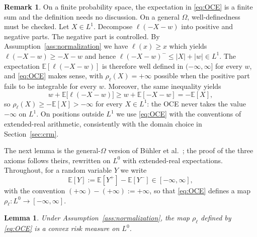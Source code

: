 \documentclass[11pt,a4paper]{report}
\numberwithin{equation}{chapter}
\theoremstyle{plain}
\newtheorem{lemma}[proposition]{Lemma}
\theoremstyle{definition}
\newtheorem{remark}[proposition]{Remark}
\newcommand{\E}{\mathbb{E}}
\begin{document}
\begin{remark}\label{rem:oce-welldef}
    On a finite probability space, the expectation in \eqref{eq:OCE} is a finite sum and the definition needs no discussion. On a general $\Omega$, well-definedness must be checked. Let $X\in L^1$. Decompose $\ell(-X-w)$ into positive and negative parts. The negative part is controlled. By Assumption~\ref{ass:normalization} we have $\ell(x)\ge x$ which yields $\ell(-X-w)\ge-X-w$ and hence $\ell(-X-w)^-\le|X|+|w|\in L^1$. The expectation $\E[\ell(-X-w)]$ is therefore well defined in $(-\infty,\infty]$ for every $w$, and \eqref{eq:OCE} makes sense, with $\rho_\ell(X)=+\infty$ possible when the positive part fails to be integrable for every $w$. Moreover, the same inequality yields
    \[
        w+\E\bigl[\ell(-X-w)\bigr]\ge w+\E[-X-w]=-\E[X],
    \]
    so $\rho_\ell(X)\ge-\E[X]>-\infty$ for every $X\in L^1$: the OCE never takes the value $-\infty$ on $L^1$. On positions outside $L^1$ we use \eqref{eq:OCE} with the conventions of extended-real arithmetic, consistently with the domain choice in Section~\ref{sec:crm}.
\end{remark}

The next lemma is the general-$\Omega$ version of B\"uhler et al.\ \cite[Lemma~3.5]{buehler}; the proof of the three axioms follows theirs, rewritten on $L^0$ with extended-real expectations. Throughout, for a random variable $Y$ we write
\[
    \E[Y]:=\E[Y^+]-\E[Y^-]\in[-\infty,\infty],
\]
with the convention $(+\infty)-(+\infty):=+\infty$, so that \eqref{eq:OCE} defines a map $\rho_\ell\colon L^0\to[-\infty,\infty]$.

\begin{lemma}\label{lem:oce-crm}
    Under Assumption~\ref{ass:normalization}, the map $\rho_\ell$ defined by \eqref{eq:OCE} is a convex risk measure on $L^0$.
\end{lemma}
\end{document}
